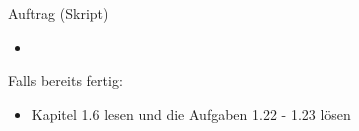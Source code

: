 \begin{frame}{Auftrag (Skript)}
    \begin{itemize}
        \item {}
    \end{itemize}
    Falls bereits fertig:
    \begin{itemize}
        \item Kapitel 1.6 lesen und die Aufgaben 1.22 - 1.23 lösen
    \end{itemize}
\end{frame}